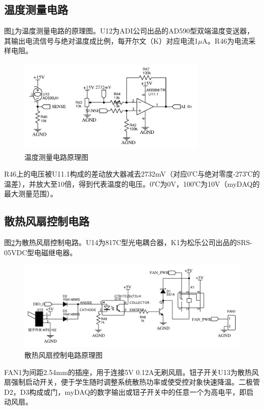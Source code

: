 \documentclass[11pt,a4paper]{article}
\begin{document}
\subsection{温度测量电路}
图\ref{ad590_sch}为温度测量电路的原理图。U12为ADI公司出品的AD590型双端温度变送器，其输出电流信号与绝对温度成比例，每开尔文（K）对应电流1$\mu$A。R46为电流采样电阻。
\begin{figure}[h!]\centering
  \includegraphics[width=9cm]{./figs/temp_ad590_sch.pdf}
  \caption{温度测量电路原理图}\label{ad590_sch}
\end{figure}

R46上的电压被U11.1构成的差动放大器减去2732mV（对应0℃与绝对零度-273℃的温差），并放大至10倍，得到代表温度的电压。0℃为0V，100℃为10V（myDAQ的最大测量范围）。

\subsection{散热风扇控制电路}
图\ref{temp_fan_sch}为散热风扇控制电路。U14为817C型光电耦合器，K1为松乐公司出品的SRS-05VDC型电磁继电器。
\begin{figure}[h!]\centering
  \includegraphics[width=13cm]{./figs/temp_fan_sch.pdf}
  \caption{散热风扇控制电路原理图}\label{temp_fan_sch}
\end{figure}

FAN1为间距2.54mm的插座，用于连接5V 0.12A无刷风扇。钮子开关U13为散热风扇强制启动开关，便于学生随时调整系统散热功率或使受控对象快速降温。二极管D2，D3构成或门，myDAQ的数字输出或钮子开关中的任意一个为高电平，即启动风扇。
\end{document}
